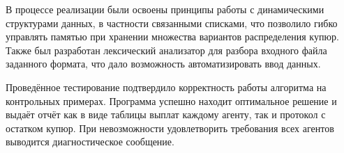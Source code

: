 \documentclass[12pt]{extarticle}
\begin{document}
В процессе реализации были освоены принципы работы с динамическими структурами данных, в частности связанными списками, что позволило гибко управлять памятью при хранении множества вариантов распределения купюр. Также был разработан лексический анализатор для разбора входного файла заданного формата, что дало возможность автоматизировать ввод данных.

Проведённое тестирование подтвердило корректность работы алгоритма на контрольных примерах. Программа успешно находит оптимальное решение и выдаёт отчёт как в виде таблицы выплат каждому агенту, так и протокол с остатком купюр. При невозможности удовлетворить требования всех агентов выводится диагностическое сообщение.
\end{document}
